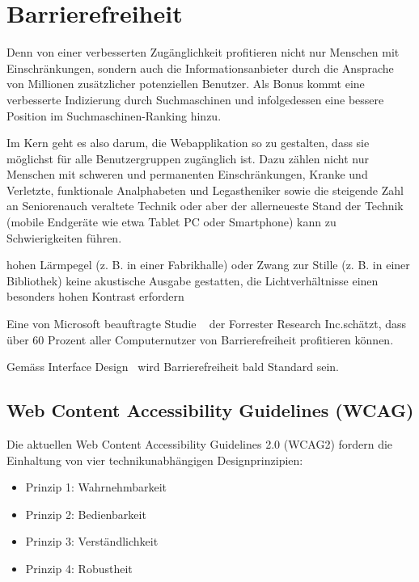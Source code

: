 \section{Barrierefreiheit}

Denn von einer verbesserten Zugänglichkeit profitieren nicht nur Menschen mit Einschränkungen, sondern auch die Informationsanbieter durch die Ansprache von Millionen zusätzlicher potenziellen Benutzer. Als Bonus kommt eine verbesserte Indizierung durch Suchmaschinen und infolgedessen eine bessere Position im Suchmaschinen-Ranking hinzu.

Im Kern geht es also darum, die Webapplikation so zu gestalten, dass sie möglichst für alle Benutzergruppen zugänglich ist. Dazu zählen nicht nur Menschen mit schweren und permanenten Einschränkungen, Kranke und Verletzte, funktionale Analphabeten und Legastheniker sowie die steigende Zahl an Seniorenauch veraltete Technik oder aber der allerneueste Stand der Technik (mobile Endgeräte wie etwa Tablet PC oder Smartphone) kann zu Schwierigkeiten führen.

hohen Lärmpegel (z. B. in einer Fabrikhalle) oder Zwang zur Stille (z. B. in einer Bibliothek) keine akustische Ausgabe gestatten, die Lichtverhältnisse einen besonders hohen Kontrast erfordern

Eine von Microsoft beauftragte Studie ~\cite{ForresterResearch2004E:Abilities} der \flqq Forrester Research Inc.\frqq schätzt, dass über 60 Prozent aller Computernutzer von Barrierefreiheit profitieren können. 


Gemäss \flqq Interface Design\frqq ~\cite{ThesmannStephan2016ID:U} wird Barrierefreiheit bald Standard sein.



\subsection{Web Content Accessibility Guidelines (WCAG)}

Die aktuellen Web Content Accessibility Guidelines 2.0 (WCAG2) fordern die Einhaltung von vier technikunabhängigen Designprinzipien:

\begin{itemize}  
\item Prinzip 1: Wahrnehmbarkeit 
\item Prinzip 2: Bedienbarkeit
\item Prinzip 3: Verständlichkeit
\item Prinzip 4: Robustheit
\end{itemize}

